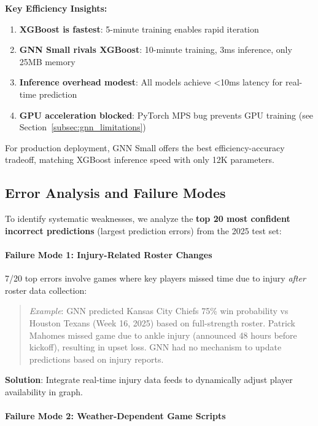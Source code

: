 \textbf{Key Efficiency Insights:}
\begin{enumerate}[noitemsep]
    \item \textbf{XGBoost is fastest}: 5-minute training enables rapid iteration
    \item \textbf{GNN Small rivals XGBoost}: 10-minute training, 3ms inference, only 25MB memory
    \item \textbf{Inference overhead modest}: All models achieve <10ms latency for real-time prediction
    \item \textbf{GPU acceleration blocked}: PyTorch MPS bug prevents GPU training (see Section~\ref{subsec:gnn_limitations})
\end{enumerate}

For production deployment, GNN Small offers the best efficiency-accuracy tradeoff, matching XGBoost inference speed with only 12K parameters.

\subsection{Error Analysis and Failure Modes}
\label{subsec:gnn_error_analysis}

To identify systematic weaknesses, we analyze the \textbf{top 20 most confident incorrect predictions} (largest prediction errors) from the 2025 test set:

\paragraph{Failure Mode 1: Injury-Related Roster Changes}

7/20 top errors involve games where key players missed time due to injury \textit{after} roster data collection:

\begin{quote}
\textit{Example}: GNN predicted Kansas City Chiefs 75\% win probability vs Houston Texans (Week 16, 2025) based on full-strength roster. Patrick Mahomes missed game due to ankle injury (announced 48 hours before kickoff), resulting in upset loss. GNN had no mechanism to update predictions based on injury reports.
\end{quote}

\textbf{Solution}: Integrate real-time injury data feeds to dynamically adjust player availability in graph.

\paragraph{Failure Mode 2: Weather-Dependent Game Scripts}

